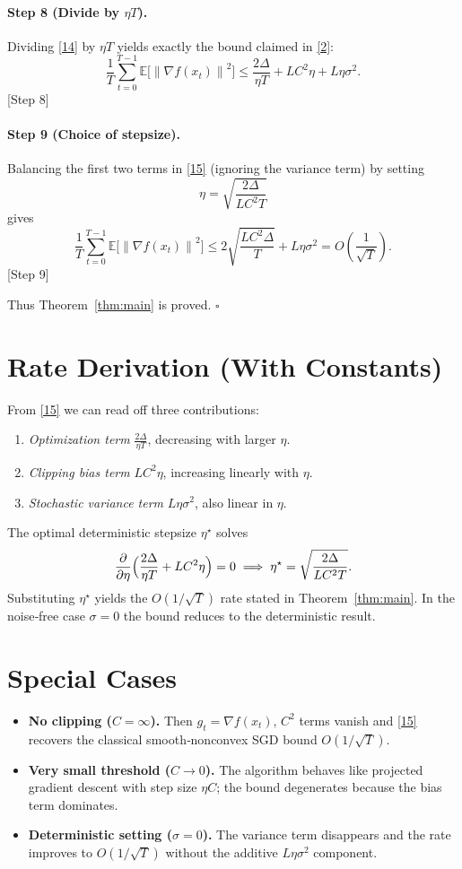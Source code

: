 \documentclass{article}
\newcommand{\norm}[1]{\left\lVert#1\right\rVert}
\newcommand{\E}{\mathbb{E}}
\begin{document}
\paragraph{Step 8 (Divide by $\eta T$).}
Dividing \eqref{14} by $\eta T$ yields exactly the bound claimed in
\eqref{2}:
\[
\frac{1}{T}\sum_{t=0}^{T-1}\E\!\bigl[\norm{\nabla f(x_t)}^{2}\bigr]
\le
\frac{2\Delta}{\eta T}
+ L C^{2}\eta
+ L\eta\sigma^{2}.
\tag{15}
\]
[Step 8]

\paragraph{Step 9 (Choice of stepsize).}
Balancing the first two terms in \eqref{15} (ignoring the variance term)
by setting
\[
\eta = \sqrt{\frac{2\Delta}{L C^{2}T}}
\tag{16}
\]
gives
\[
\frac{1}{T}\sum_{t=0}^{T-1}\E\!\bigl[\norm{\nabla f(x_t)}^{2}\bigr]
\le
2\sqrt{\frac{L C^{2}\Delta}{T}}+L\eta\sigma^{2}
=O\!\left(\frac{1}{\sqrt{T}}\right).
\tag{17}
\]
[Step 9]

Thus Theorem~\ref{thm:main} is proved. \hfill $\square$

\section*{Rate Derivation (With Constants)}
From \eqref{15} we can read off three contributions:
\begin{enumerate}[label={\arabic*.}]
\item \emph{Optimization term} $\displaystyle\frac{2\Delta}{\eta T}$, decreasing with larger $\eta$.
\item \emph{Clipping bias term} $\displaystyle L C^{2}\eta$, increasing linearly with $\eta$.
\item \emph{Stochastic variance term} $\displaystyle L\eta\sigma^{2}$, also linear in $\eta$.
\end{enumerate}
The optimal deterministic stepsize $\eta^{\star}$ solves
\[
\frac{\partial}{\partial\eta}\Bigl(\frac{2\Delta}{\eta T}+L C^{2}\eta\Bigr)=0
\;\Longrightarrow\;
\eta^{\star}= \sqrt{\frac{2\Delta}{L C^{2}T}} .
\]
Substituting $\eta^{\star}$ yields the $O(1/\sqrt{T})$ rate stated in
Theorem~\ref{thm:main}.  In the noise‑free case $\sigma=0$ the bound reduces
to the deterministic result.

\section*{Special Cases}
\begin{itemize}
\item \textbf{No clipping ($C=\infty$).}
Then $g_t=\nabla f(x_t)$, $C^{2}$ terms vanish and \eqref{15} recovers the
classical smooth‐nonconvex SGD bound $O(1/\sqrt{T})$.
\item \textbf{Very small threshold ($C\to0$).}
The algorithm behaves like projected gradient descent with step size
$\eta C$; the bound degenerates because the bias term dominates.
\item \textbf{Deterministic setting ($\sigma=0$).}
The variance term disappears and the rate improves to
$O(1/\sqrt{T})$ without the additive $L\eta\sigma^{2}$ component.
\end{itemize}
\end{document}

